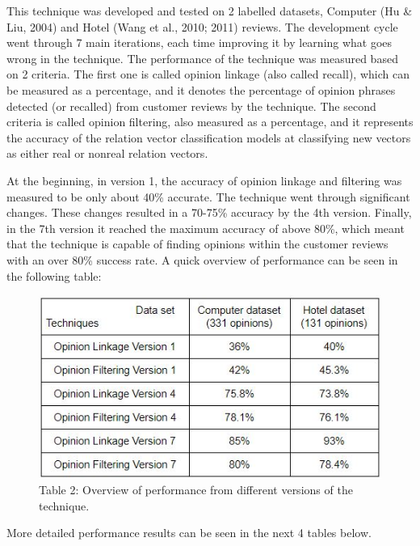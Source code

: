 \documentclass{sig-alternate}
\begin{document}
This technique was developed and tested on 2 labelled datasets, Computer (Hu \& Liu, 2004) and Hotel (Wang et al., 2010; 2011) reviews. The development cycle went through 7 main iterations, each time improving it by learning what goes wrong in the technique. The performance of the technique was measured based on 2 criteria. The first one is called opinion linkage (also called recall), which can be measured as a percentage, and it denotes the percentage of opinion phrases detected (or recalled) from customer reviews by the technique. The second criteria is called opinion filtering, also measured as a percentage, and it represents the accuracy of the relation vector classification models at classifying new vectors as either real or nonreal relation vectors.

At the beginning, in version 1, the accuracy of opinion linkage and filtering was measured to be only about 40\% accurate. The technique went through significant changes. These changes resulted in a 70-75\% accuracy by the 4th version. Finally, in the 7th version it reached the maximum accuracy of above 80\%, which meant that the technique is capable of finding opinions within the customer reviews with an over 80\% success rate. A quick overview of performance can be seen in the following table:

\begin{figure}
\centering
\includegraphics[scale=0.75]{images/table2.JPG}
Table 2: Overview of performance from different versions of the technique.
\end{figure}

More detailed performance results can be seen in the next 4 tables below.
\end{document}
